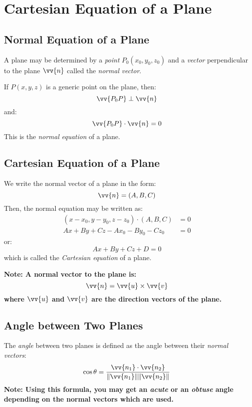 \section{Cartesian Equation of a Plane}
\subsection{Normal Equation of a Plane}
	A plane may be determined by a \emph{point} $P_0(x_0,y_0,z_0)$ and a \emph{vector} perpendicular to the plane $\vv{n}$ called the \emph{normal vector}.

	If $P(x,y,z)$ is a generic point on the plane, then:
	\[\vv{P_0P} \perp \vv{n}\]
	and:
	\[\vv{P_0P} \cdot \vv{n} = 0\]
	This is the \emph{normal equation} of a plane.
\subsection{Cartesian Equation of a Plane}
	We write the normal vector of a plane in the form:
	\[\vv{n} = (A, B, C)\]
	Then, the normal equation may be written as:
	\begin{align*}
		(x - x_0, y-y_0, z-z_0) \cdot (A, B, C) &= 0\\
		Ax + By + Cz - Ax_0 - By_0 - Cz_0 &= 0
	\end{align*}
	or:
	\[Ax + By + Cz + D = 0\]
	which is called the \emph{Cartesian equation} of a plane.

	\textbf{Note: A normal vector to the plane is:
	\[\vv{n} = \vv{u} \times \vv{v}\]
	where $\vv{u}$ and $\vv{v}$ are the direction vectors of the plane.}
\subsection{Angle between Two Planes}
	The \emph{angle} between two planes is defined as the angle between their \emph{normal vectors}:
	\[\cos \theta = \frac{\vv{n_1} \cdot \vv{n_2}}{\norm{\vv{n_1}} \norm{\vv{n_2}}}\]
	\textbf{Note: Using this formula, you may get an \emph{acute} or an \emph{obtuse} angle depending on the normal vectors which are used.}
